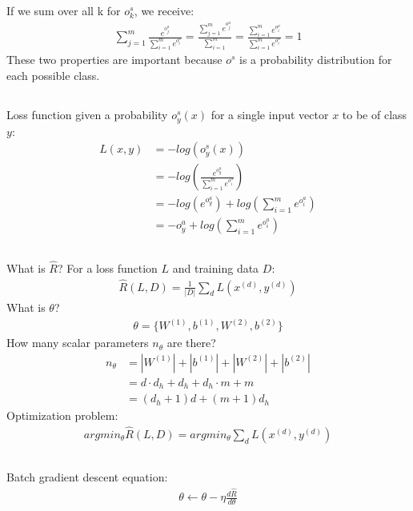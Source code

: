 \documentclass[12pt]{article}
\begin{document}
If we sum over all k for $o^s_k$, we receive:
\begin{align*}
\sum\limits_{j=1}^m \frac{e^{o^a_j}}{\sum\limits_{i=1}^m e^{o^a_i}} = \frac{\sum\limits_{j=1}^m e^{o^a_j}}{\sum\limits_{i=1}^m} = \frac{\sum\limits_{i=1}^m e^{o^a_i}}{\sum\limits_{i=1}^m e^{o^a_i}} = 1
\end{align*}
These two properties are important because $o^s$ is a probability distribution for each possible class.
\subsection{}
Loss function given a probability $o_y^s(x)$ for a single input vector $x$ to be of class $y$: 
\begin{align*}
L(x,y) & = -log(o_y^s(x)) \\
& = -log(\frac{e^{o^a_y}}{\sum\limits_{i=1}^m e^{o^a_i}}) \\
& = -log(e^{o^a_y}) +log(\sum\limits_{i=1}^m e^{o^a_i}) \\
& = -o^a_y+log(\sum\limits_{i=1}^m e^{o^a_i})
\end{align*}
\subsection{}
What is $\hat{R}$? For a loss function $L$ and training data $D$:
\begin{align*}
\hat{R}(L,D) = \frac{1}{|D|} \sum\limits_d L(x^{(d)},y^{(d)})
\end{align*}
What is $\theta$?
\begin{align*}
\theta = \{W^{(1)},b^{(1)},W^{(2)},b^{(2)}\}
\end{align*}
How many scalar parameters $n_\theta$ are there?
\begin{align*}
n_\theta &= |W^{(1)}|+|b^{(1)}|+|W^{(2)}|+|b^{(2)}| \\
&= d \cdot d_h + d_h + d_h \cdot m + m \\
& = (d_h + 1)d+(m+1)d_h
\end{align*}
Optimization problem:
\begin{align*}
arg min_\theta \hat{R}(L,D) =argmin_\theta \sum\limits_d L(x^{(d)},y^{(d)})
\end{align*}
\subsection{}
Batch gradient descent equation:
\begin{align*}
\theta \leftarrow \theta - \eta \frac{d\hat{R}}{d\theta}
\end{align*}
\end{document}
